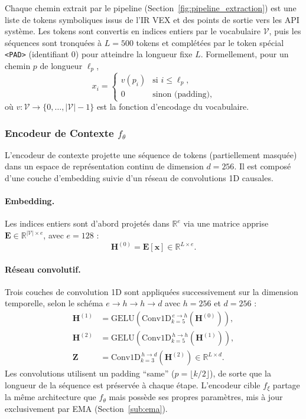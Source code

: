 Chaque chemin extrait par le pipeline (Section~\ref{fig:pipeline_extraction})
est une liste de tokens symboliques issus de l'IR VEX et des points
de sortie vers les API système. Les tokens sont convertis en indices
entiers par le vocabulaire $\mathcal{V}$, puis les séquences sont
tronquées à $L = 500$ tokens et complétées par le token spécial
\texttt{<PAD>} (identifiant $0$) pour atteindre la longueur fixe $L$.
Formellement, pour un chemin $p$ de longueur $\ell_p$,
\[
  x_i =
  \begin{cases}
    v(p_i) & \text{si } i \le \ell_p,\\
    0       & \text{sinon (padding)},
  \end{cases}
\]
où $v : \mathcal{V} \to \{0, \ldots, |\mathcal{V}|-1\}$ est la
fonction d'encodage du vocabulaire.
 
\subsubsection{Encodeur de Contexte \texorpdfstring{$f_\theta$}{f\_theta}}
\label{sub:context_encoder}
 
L'encodeur de contexte projette une séquence de tokens (partiellement
masquée) dans un espace de représentation continu de dimension $d=256$.
Il est composé d'une couche d'embedding suivie d'un réseau de
convolutions 1D causales.
 
\paragraph{Embedding.}
Les indices entiers sont d'abord projetés dans $\mathbb{R}^{e}$
via une matrice apprise $\bm{E} \in \mathbb{R}^{|\mathcal{V}| \times e}$,
avec $e = 128$ :
\[
  \bm{H}^{(0)} = \bm{E}[\bm{x}] \in \mathbb{R}^{L \times e}.
\]
 
\paragraph{Réseau convolutif.}
Trois couches de convolution 1D sont appliquées successivement sur
la dimension temporelle, selon le schéma
$e \to h \to h \to d$ avec $h = 256$ et $d = 256$ :
\begin{align}
  \bm{H}^{(1)} &= \mathrm{GELU}\!\left(
    \mathrm{Conv1D}_{k=5}^{\,e \to h}\!\left(\bm{H}^{(0)}\right)\right),
  \label{eq:conv1}\\
  \bm{H}^{(2)} &= \mathrm{GELU}\!\left(
    \mathrm{Conv1D}_{k=5}^{\,h \to h}\!\left(\bm{H}^{(1)}\right)\right),
  \label{eq:conv2}\\
  \bm{Z} &= \mathrm{Conv1D}_{k=3}^{\,h \to d}\!\left(\bm{H}^{(2)}\right)
            \in \mathbb{R}^{L \times d}.
  \label{eq:conv3}
\end{align}
Les convolutions utilisent un padding ``same'' ($p = \lfloor k/2
\rfloor$), de sorte que la longueur de la séquence est préservée à
chaque étape. L'encodeur cible $f_\xi$ partage la même architecture
que $f_\theta$ mais possède ses propres paramètres, mis à jour
exclusivement par EMA (Section~\ref{sub:ema}).
 
